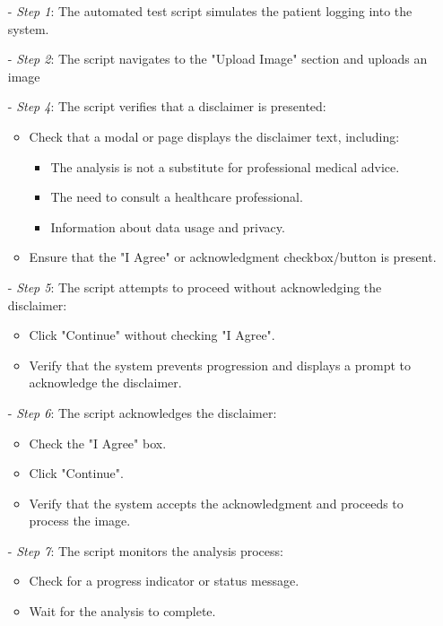 \documentclass[12pt, titlepage]{article}
\begin{document}
\begin{enumerate}
\begin{itemize}
  \item[-] \textit{Step 1}: The automated test script simulates the patient logging into the system.
  \item[-] \textit{Step 2}: The script navigates to the "Upload Image" section and uploads an image 
  \item[-] \textit{Step 4}: The script verifies that a disclaimer is presented:
    \begin{itemize}
      \item Check that a modal or page displays the disclaimer text, including:
        \begin{itemize}
          \item The analysis is not a substitute for professional medical advice.
          \item The need to consult a healthcare professional.
          \item Information about data usage and privacy.
        \end{itemize}
      \item Ensure that the "I Agree" or acknowledgment checkbox/button is present.
    \end{itemize}
  \item[-] \textit{Step 5}: The script attempts to proceed without acknowledging the disclaimer:
    \begin{itemize}
      \item Click "Continue" without checking "I Agree".
      \item Verify that the system prevents progression and displays a prompt to acknowledge the disclaimer.
    \end{itemize}
  \item[-] \textit{Step 6}: The script acknowledges the disclaimer:
    \begin{itemize}
      \item Check the "I Agree" box.
      \item Click "Continue".
      \item Verify that the system accepts the acknowledgment and proceeds to process the image.
    \end{itemize}
  \item[-] \textit{Step 7}: The script monitors the analysis process:
    \begin{itemize}
      \item Check for a progress indicator or status message.
      \item Wait for the analysis to complete.

\end{itemize}
\end{itemize}
\end{enumerate}
\end{document}
